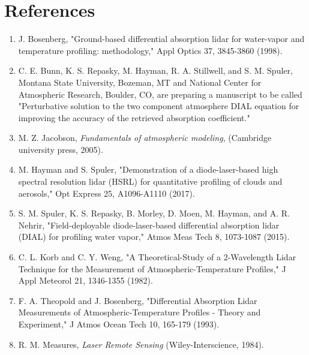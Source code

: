\documentclass[twoside]{article}
\begin{document}
\section{References}
\begin{enumerate}
\item J. Bosenberg, "Ground-based differential absorption lidar for water-vapor and temperature profiling: methodology," Appl Optics 37, 3845-3860 (1998).

\item C. E. Bunn, K. S. Repasky, M. Hayman, R. A. Stillwell, and S. M. Spuler, Montana State University, Bozeman, MT and National Center for Atmospheric Research, Boulder, CO, are preparing a manuscript to be called "Perturbative solution to the two component atmosphere DIAL equation for improving the accuracy of the retrieved absorption coefficient."

\item M. Z. Jacobson, \textit{Fundamentals of atmospheric modeling}, (Cambridge university press, 2005).

\item M. Hayman and S. Spuler, "Demonstration of a diode-laser-based high spectral resolution lidar (HSRL) for quantitative profiling of clouds and aerosols," Opt Express 25, A1096-A1110 (2017).

\item S. M. Spuler, K. S. Repasky, B. Morley, D. Moen, M. Hayman, and A. R. Nehrir, "Field-deployable diode-laser-based differential absorption lidar (DIAL) for profiling water vapor," Atmos Meas Tech 8, 1073-1087 (2015).

\item C. L. Korb and C. Y. Weng, "A Theoretical-Study of a 2-Wavelength Lidar Technique for the Measurement of Atmospheric-Temperature Profiles," J Appl Meteorol 21, 1346-1355 (1982).

\item F. A. Theopold and J. Bosenberg, "Differential Absorption Lidar Measurements of Atmospheric-Temperature Profiles - Theory and Experiment," J Atmos Ocean Tech 10, 165-179 (1993).

\item R. M. Measures, \textit{Laser Remote Sensing} (Wiley-Interscience, 1984).
\end{enumerate}


\end{document}
